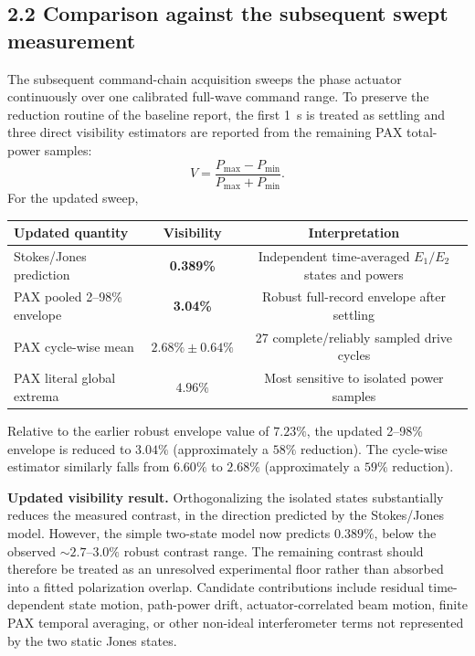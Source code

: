 \documentclass[10pt]{article}
\begin{document}
\subsection*{2.2 Comparison against the subsequent swept measurement}
The subsequent command-chain acquisition sweeps the phase actuator continuously over one calibrated full-wave command range. To preserve the reduction routine of the baseline report, the first \SI{1}{s} is treated as settling and three direct visibility estimators are reported from the remaining PAX total-power samples:
\begin{equation}
V=\frac{P_{\max}-P_{\min}}{P_{\max}+P_{\min}}.
\end{equation}
For the updated sweep,
\begin{center}
\begin{tabular}{lcc}
\toprule
Updated quantity & Visibility & Interpretation \\
\midrule
Stokes/Jones prediction & \textbf{0.389\%} & Independent time-averaged $E_1/E_2$ states and powers \\
PAX pooled 2--98\% envelope & \textbf{3.04\%} & Robust full-record envelope after settling \\
PAX cycle-wise mean & $2.68\%\pm0.64\%$ & 27 complete/reliably sampled drive cycles \\
PAX literal global extrema & $4.96\%$ & Most sensitive to isolated power samples \\
\bottomrule
\end{tabular}
\end{center}

Relative to the earlier robust envelope value of $7.23\%$, the updated 2--98\% envelope is reduced to $3.04\%$ (approximately a $58\%$ reduction). The cycle-wise estimator similarly falls from $6.60\%$ to $2.68\%$ (approximately a $59\%$ reduction).

\begin{tcolorbox}[colback=light,colframe=navy,boxrule=0.6pt,arc=1.5pt,left=6pt,right=6pt,top=5pt,bottom=5pt]
\textbf{Updated visibility result.} Orthogonalizing the isolated states substantially reduces the measured contrast, in the direction predicted by the Stokes/Jones model. However, the simple two-state model now predicts $0.389\%$, below the observed $\sim2.7$--$3.0\%$ robust contrast range. The remaining contrast should therefore be treated as an unresolved experimental floor rather than absorbed into a fitted polarization overlap. Candidate contributions include residual time-dependent state motion, path-power drift, actuator-correlated beam motion, finite PAX temporal averaging, or other non-ideal interferometer terms not represented by the two static Jones states.
\end{tcolorbox}
\end{document}
